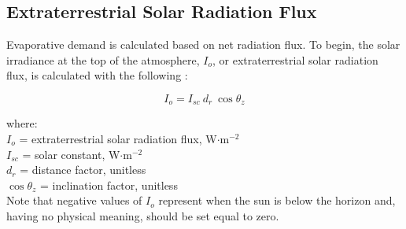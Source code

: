 \subsection{Extraterrestrial Solar Radiation Flux}
\label{sec:ra}
Evaporative demand is calculated based on net radiation flux. 
To begin, the solar irradiance at the top of the atmosphere, $I_o$, or extraterrestrial solar radiation flux, is calculated with the following \parencite[Eq.~1.10.2]{duffie13}:

%
\begin{equation}
\label{eq:etsr}
    I_o = I_{sc} \: d_{r} \: \cos \theta_z
\end{equation}

\noindent where: \\
\indent $I_{o}$ = extraterrestrial solar radiation flux, W$\cdot$m$^{-2}$ \\
\indent $I_{sc}$ = solar constant, W$\cdot$m$^{-2}$ \\
\indent $d_{r}$ = distance factor, unitless \\
\indent $\cos \theta_z$ = inclination factor, unitless \\

\noindent Note that negative values of $I_o$ represent when the sun is below the horizon and, having no physical meaning, should be set equal to zero.


